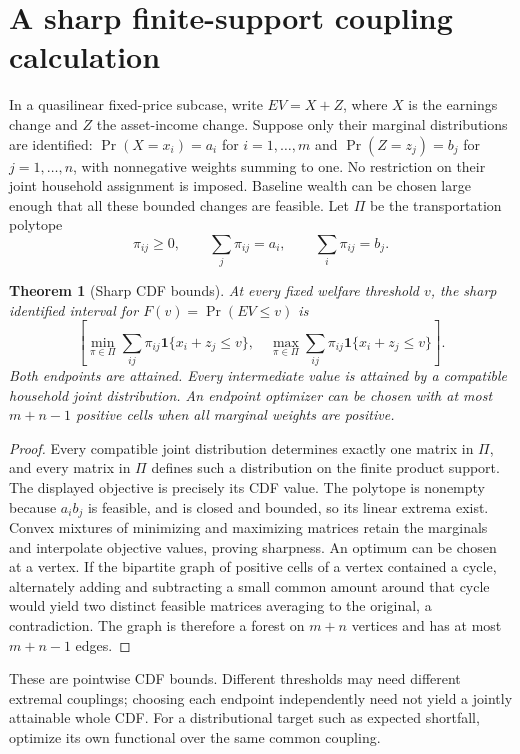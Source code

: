 \documentclass[11pt]{article}
\newtheorem{theorem}{Theorem}
\theoremstyle{definition}
\begin{document}
\section*{A sharp finite-support coupling calculation}
In a quasilinear fixed-price subcase, write $EV=X+Z$, where $X$ is the
earnings change and $Z$ the asset-income change. Suppose only their
marginal distributions are identified:
$\Pr(X=x_i)=a_i$ for $i=1,\ldots,m$ and
$\Pr(Z=z_j)=b_j$ for $j=1,\ldots,n$, with nonnegative weights summing to one.
No restriction on their joint household assignment is imposed. Baseline
wealth can be chosen large enough that all these bounded changes are feasible.
Let $\Pi$ be the transportation polytope
\[
 \pi_{ij}\ge0,\qquad\sum_j\pi_{ij}=a_i,\qquad\sum_i\pi_{ij}=b_j.
\]
\begin{theorem}[Sharp CDF bounds]
At every fixed welfare threshold $v$, the sharp identified interval for
$F(v)=\Pr(EV\le v)$ is
\[
 \left[\min_{\pi\in\Pi}\sum_{ij}\pi_{ij}\mathbf1\{x_i+z_j\le v\},\quad
       \max_{\pi\in\Pi}\sum_{ij}\pi_{ij}\mathbf1\{x_i+z_j\le v\}\right]. \tag{2}
\]
Both endpoints are attained. Every intermediate value is attained by a
compatible household joint distribution. An endpoint optimizer can be
chosen with at most $m+n-1$ positive cells when all marginal weights are positive.
\end{theorem}
\begin{proof}
Every compatible joint distribution determines exactly one matrix in $\Pi$,
and every matrix in $\Pi$ defines such a distribution on the finite product
support. The displayed objective is precisely its CDF value. The polytope
is nonempty because $a_ib_j$ is feasible, and is closed and bounded, so its
linear extrema exist. Convex mixtures of minimizing and maximizing matrices
retain the marginals and interpolate objective values, proving sharpness.
An optimum can be chosen at a vertex. If the bipartite graph of positive
cells of a vertex contained a cycle, alternately adding and subtracting a
small common amount around that cycle would yield two distinct feasible
matrices averaging to the original, a contradiction. The graph is therefore
a forest on $m+n$ vertices and has at most $m+n-1$ edges.
\end{proof}

These are pointwise CDF bounds. Different thresholds may need different
extremal couplings; choosing each endpoint independently need not yield
a jointly attainable whole CDF. For a distributional target such as expected
shortfall, optimize its own functional over the same common coupling.
\end{document}
